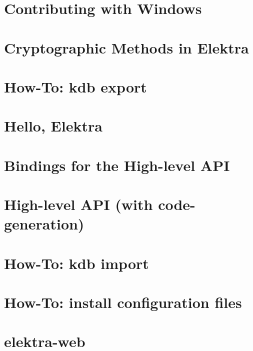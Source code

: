 \let\mypdfximage\pdfximage\def\pdfximage{\immediate\mypdfximage}\documentclass[twoside]{book}
\newcommand{\+}{\discretionary{\mbox{\scriptsize$\hookleftarrow$}}{}{}}
\begin{document}
\chapter{Contributing with Windows}
\label{doc_tutorials_contributing-windows_md}

\chapter{Cryptographic Methods in Elektra}
\label{doc_tutorials_crypto_md}

\chapter{How-\/\+To\+: kdb export}
\label{doc_tutorials_export_md}

\chapter{Hello, Elektra}
\label{doc_tutorials_hello-elektra_md}

\chapter{Bindings for the High-\/level API}
\label{doc_tutorials_highlevel-bindings_md}

\chapter{High-\/level API (with code-\/generation)}
\label{doc_tutorials_highlevel_md}

\chapter{How-\/\+To\+: kdb import}
\label{doc_tutorials_import_md}

\chapter{How-\/\+To\+: install configuration files}
\label{doc_tutorials_install-config-files_md}

\chapter{elektra-\/web}
\label{doc_tutorials_install-webui_md}

\end{document}
